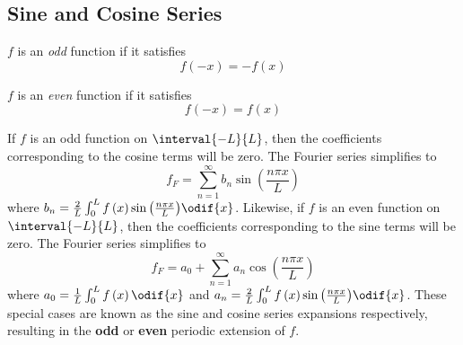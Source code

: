 \documentclass{article}
\begin{document}
\subsection{Sine and Cosine Series}
\begin{definition}
    \(f\) is an \textit{odd} function if it satisfies
    \begin{equation*}
        f\left( -x \right) = -f\left( x \right)
    \end{equation*}
\end{definition}
\begin{definition}
    \(f\) is an \textit{even} function if it satisfies
    \begin{equation*}
        f\left( -x \right) = f\left( x \right)
    \end{equation*}
\end{definition}
If \(f\) is an odd function on \(\interval{-L}{L}\), then the coefficients corresponding to the cosine terms will be zero.
The Fourier series simplifies to
\begin{equation*}
    f_F = \sum_{n = 1}^\infty b_n \sin{\left( \frac{n \pi x}{L} \right)}
\end{equation*}
where \(b_n = \frac{2}{L} \int_0^L f\left( x \right) \sin{\left( \frac{n \pi x}{L} \right)} \odif{x}\).
Likewise, if \(f\) is an even function on \(\interval{-L}{L}\), then the coefficients corresponding to the sine terms will be zero.
The Fourier series simplifies to
\begin{equation*}
    f_F = a_0 + \sum_{n = 1}^\infty a_n \cos{\left( \frac{n \pi x}{L} \right)}
\end{equation*}
where \(a_0 = \frac{1}{L} \int_0^L f\left( x \right) \odif{x}\) and \(a_n = \frac{2}{L} \int_0^L f\left( x \right) \sin{\left( \frac{n \pi x}{L} \right)} \odif{x}\).
These special cases are known as the sine and cosine series expansions respectively, resulting in the \textbf{odd} or \textbf{even} periodic extension of \(f\).
\end{document}
